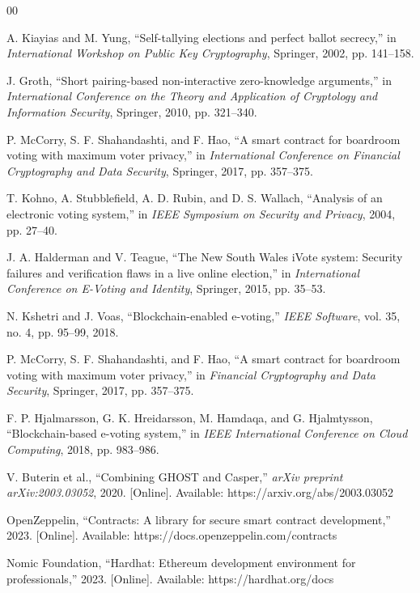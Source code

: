 \documentclass[conference]{IEEEtran}
\begin{document}
\begin{thebibliography}{00}

A. Kiayias and M. Yung, ``Self-tallying elections and perfect ballot secrecy,'' in \textit{International Workshop on Public Key Cryptography}, Springer, 2002, pp. 141--158.

J. Groth, ``Short pairing-based non-interactive zero-knowledge arguments,'' in \textit{International Conference on the Theory and Application of Cryptology and Information Security}, Springer, 2010, pp. 321--340.

P. McCorry, S. F. Shahandashti, and F. Hao, ``A smart contract for boardroom voting with maximum voter privacy,'' in \textit{International Conference on Financial Cryptography and Data Security}, Springer, 2017, pp. 357--375.

T. Kohno, A. Stubblefield, A. D. Rubin, and D. S. Wallach, ``Analysis of an electronic voting system,'' in \textit{IEEE Symposium on Security and Privacy}, 2004, pp. 27--40.

J. A. Halderman and V. Teague, ``The New South Wales iVote system: Security failures and verification flaws in a live online election,'' in \textit{International Conference on E-Voting and Identity}, Springer, 2015, pp. 35--53.

N. Kshetri and J. Voas, ``Blockchain-enabled e-voting,'' \textit{IEEE Software}, vol. 35, no. 4, pp. 95--99, 2018.

P. McCorry, S. F. Shahandashti, and F. Hao, ``A smart contract for boardroom voting with maximum voter privacy,'' in \textit{Financial Cryptography and Data Security}, Springer, 2017, pp. 357--375.

F. P. Hjalmarsson, G. K. Hreidarsson, M. Hamdaqa, and G. Hjalmtysson, ``Blockchain-based e-voting system,'' in \textit{IEEE International Conference on Cloud Computing}, 2018, pp. 983--986.

V. Buterin et al., ``Combining GHOST and Casper,'' \textit{arXiv preprint arXiv:2003.03052}, 2020. [Online]. Available: https://arxiv.org/abs/2003.03052

OpenZeppelin, ``Contracts: A library for secure smart contract development,'' 2023. [Online]. Available: https://docs.openzeppelin.com/contracts

Nomic Foundation, ``Hardhat: Ethereum development environment for professionals,'' 2023. [Online]. Available: https://hardhat.org/docs


\end{thebibliography}
\end{document}

